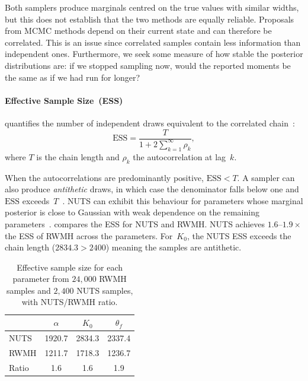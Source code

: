 Both samplers produce marginals centred on the true values with
similar widths, but this does not establish that the two methods
are equally reliable. Proposals from MCMC methods depend on their
current state and can therefore be correlated. This is an issue since
correlated samples contain less information than independent ones.
Furthermore, we seek some measure of how stable the posterior
distributions are: if we stopped sampling now, would the reported
moments be the same as if we had run for longer?

\paragraph{Effective Sample Size~(ESS)} quantifies the number of
independent draws equivalent to the correlated
chain~\cite{gelman2013bayesian,geyer2011introduction}:
\begin{equation}
  \mathrm{ESS} = \frac{T}{1 + 2\sum_{k=1}^{\infty} \rho_k},
  \label{eq:ess}
\end{equation}
where $T$ is the chain length and $\rho_k$ the autocorrelation at
lag~$k$.

When the autocorrelations are predominantly positive,
$\mathrm{ESS} < T$. A sampler can also produce \emph{antithetic}
draws, in which case the denominator
falls below one and $\mathrm{ESS}$
exceeds~$T$~\cite{stan2024reference,vehtari2021rank}. NUTS can exhibit this
behaviour for parameters whose marginal posterior is close to
Gaussian with weak dependence on the remaining
parameters~\cite{stan2024reference}.  compares
the ESS for NUTS and RWMH. NUTS achieves $1.6$--$1.9\times$ the ESS
of RWMH across the parameters. For~$K_0$, the NUTS ESS exceeds the
chain length ($2834.3 > 2400$) meaning the samples are antithetic.

\begin{table}[ht]
  \centering
  \begin{tabular}{lccc}
    \hline
    & $\alpha$ & $K_0$ & $\theta_f$ \\
    \hline
    NUTS & 1920.7 & 2834.3 & 2337.4\\
    RWMH & 1211.7 & 1718.3 & 1236.7\\
    Ratio & 1.6 & 1.6 & 1.9 \\
    \hline
  \end{tabular}
  \caption[ESS for the electron-transfer reaction]{Effective sample
    size for each parameter from $24{,}000$ RWMH samples and $2{,}400$
  NUTS samples, with NUTS/RWMH ratio.}
  \label{tab:electron-ess}
\end{table}

